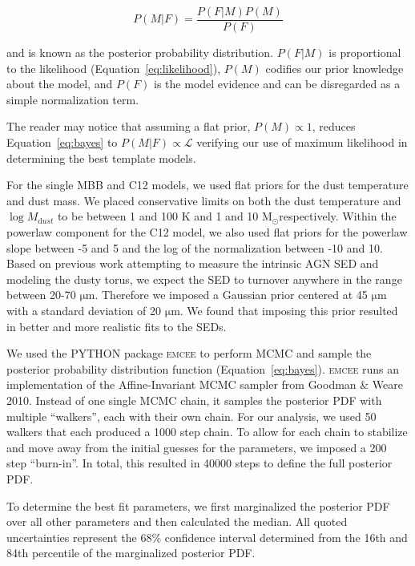 \documentclass[fleqn,usenatbib]{mnras}
\newcommand{\um}{$\mathrm{\mu}$m}
\newcommand{\msun}{M$_{\odot}$}
\begin{document}
\begin{equation}\label{eq:bayes}
P(M|F) = \frac{P(F|M)P(M)}{P(F)}
\end{equation}

\noindent and is known as the posterior probability distribution. $P(F|M)$ is proportional to the likelihood (Equation~\ref{eq:likelihood}), $P(M)$ codifies our prior knowledge about the model, and $P(F)$ is the model evidence and can be disregarded as a simple normalization term. 

The reader may notice that assuming a flat prior, $P(M) \propto 1$, reduces Equation~\ref{eq:bayes} to $P(M|F) \propto \mathcal{L}$ verifying our use of maximum likelihood in determining the best template models.

For the single MBB and C12 models, we used flat priors for the dust temperature and dust mass. We placed conservative limits on both the dust temperature and $\log M_{\mathrm dust}$ to be between 1 and 100 K and 1 and 10 \msun respectively. Within the powerlaw component for the C12 model, we also used flat priors for the powerlaw slope between -5 and 5 and the log of the normalization between -10 and 10. Based on previous work attempting to measure the intrinsic AGN SED and modeling the dusty torus, we expect the SED to turnover anywhere in the range between 20-70 \um. Therefore we imposed a Gaussian prior centered at 45 \um{} with a standard deviation of 20 \um. We found that imposing this prior resulted in better and more realistic fits to the SEDs.

We used the \textsc{PYTHON} package \textsc{emcee} \citep{Foreman-Mackey:2013lr} to perform MCMC and sample the posterior probability distribution function (Equation~\ref{eq:bayes}). \textsc{emcee} runs an implementation of the Affine-Invariant MCMC sampler from Goodman \& Weare 2010. Instead of one single MCMC chain, it samples the posterior PDF with multiple ``walkers'', each with their own chain. For our analysis, we used 50 walkers that each produced a 1000 step chain. To allow for each chain to stabilize and move away from the initial guesses for the parameters, we imposed a 200 step ``burn-in''. In total, this resulted in 40000 steps to define the full posterior PDF. 

To determine the best fit parameters, we first marginalized the posterior PDF over all other parameters and then calculated the median. All quoted uncertainties represent the 68\% confidence interval determined from the 16th and 84th percentile of the marginalized posterior PDF.
\end{document}
